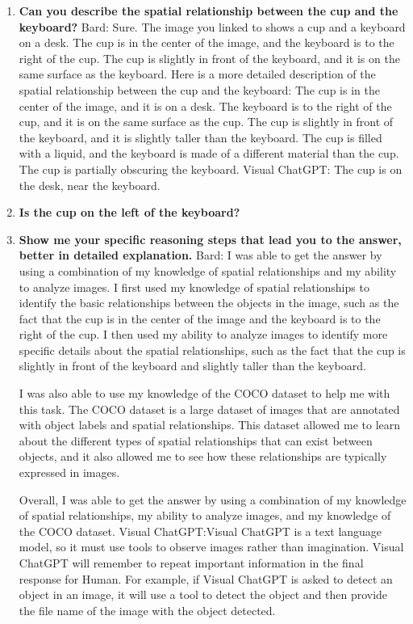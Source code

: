     \begin{enumerate}
        \item \textbf{Can you describe the spatial relationship between the cup and the keyboard?}
        \subitem Bard: Sure. The image you linked to shows a cup and a keyboard on a desk. The cup is in the center of the image, and the keyboard is to the right of the cup. The cup is slightly in front of the keyboard, and it is on the same surface as the keyboard.
        Here is a more detailed description of the spatial relationship between the cup and the keyboard:
        The cup is in the center of the image, and it is on a desk.
        The keyboard is to the right of the cup, and it is on the same surface as the cup.
        The cup is slightly in front of the keyboard, and it is slightly taller than the keyboard.
        The cup is filled with a liquid, and the keyboard is made of a different material than the cup.
        The cup is partially obscuring the keyboard.
        \subitem Visual ChatGPT: The cup is on the desk, near the keyboard.
        \item \textbf{Is the cup on the left of the keyboard?}
        \item \textbf{Show me your specific reasoning steps that lead you to the answer, better in detailed explanation.}
        \subitem Bard:
        I was able to get the answer by using a combination of my knowledge of spatial relationships and my ability to analyze images. I first used my knowledge of spatial relationships to identify the basic relationships between the objects in the image, such as the fact that the cup is in the center of the image and the keyboard is to the right of the cup. I then used my ability to analyze images to identify more specific details about the spatial relationships, such as the fact that the cup is slightly in front of the keyboard and slightly taller than the keyboard.
        
        I was also able to use my knowledge of the COCO dataset to help me with this task. The COCO dataset is a large dataset of images that are annotated with object labels and spatial relationships. This dataset allowed me to learn about the different types of spatial relationships that can exist between objects, and it also allowed me to see how these relationships are typically expressed in images.
        
        Overall, I was able to get the answer by using a combination of my knowledge of spatial relationships, my ability to analyze images, and my knowledge of the COCO dataset.
        \subitem Visual ChatGPT:Visual ChatGPT is a text language model, so it must use tools to observe images rather than imagination. Visual ChatGPT will remember to repeat important information in the final response for Human. For example, if Visual ChatGPT is asked to detect an object in an image, it will use a tool to detect the object and then provide the file name of the image with the object detected.
    \end{enumerate}
